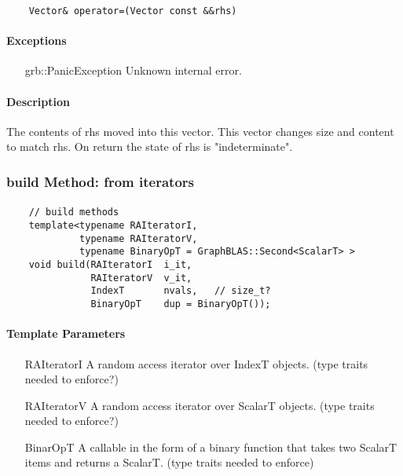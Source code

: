 {\begin{verbatim}
    Vector& operator=(Vector const &&rhs)
\end{verbatim}

\paragraph{Exceptions}

\begin{itemize}[leftmargin=2.1in]
    \item[{\sf grb::PanicException}]   Unknown internal error.
\end{itemize}

\paragraph{Description}

The contents of {\sf rhs} moved into this vector.  This vector changes size and content to match {\sf rhs}.
On return the state of {\sf rhs} is "indeterminate".


\subsubsection{{\sf build} Method: from iterators}


\paragraph{\syntax}

\begin{verbatim}
    // build methods
    template<typename RAIteratorI,
             typename RAIteratorV,
             typename BinaryOpT = GraphBLAS::Second<ScalarT> >
    void build(RAIteratorI  i_it,
               RAIteratorV  v_it,
               IndexT       nvals,   // size_t?
               BinaryOpT    dup = BinaryOpT());
\end{verbatim}

\paragraph{Template Parameters}

\begin{itemize}[leftmargin=1.1in]
    \item[{\sf RAIteratorI}] A random access iterator over IndexT objects.  (type traits needed to enforce?)
    \item[{\sf RAIteratorV}] A random access iterator over ScalarT objects.  (type traits needed to enforce?)
    \item[{\sf BinarOpT}]    A callable in the form of a binary function
                             that takes two ScalarT items and returns a ScalarT. (type traits needed to enforce)
\end{itemize}

}
